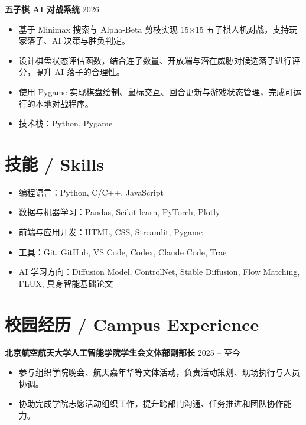 \documentclass[10pt,a4paper]{article}
\begin{document}
\textbf{五子棋 AI 对战系统} \hfill 2026
\begin{itemize}
    \item 基于 Minimax 搜索与 Alpha-Beta 剪枝实现 15$\times$15 五子棋人机对战，支持玩家落子、AI 决策与胜负判定。
    \item 设计棋盘状态评估函数，结合连子数量、开放端与潜在威胁对候选落子进行评分，提升 AI 落子的合理性。
    \item 使用 Pygame 实现棋盘绘制、鼠标交互、回合更新与游戏状态管理，完成可运行的本地对战程序。
    \item 技术栈：Python, Pygame
\end{itemize}

\section*{技能 / Skills}
\begin{itemize}
    \item 编程语言：Python, C/C++, JavaScript
    \item 数据与机器学习：Pandas, Scikit-learn, PyTorch, Plotly
    \item 前端与应用开发：HTML, CSS, Streamlit, Pygame
    \item 工具：Git, GitHub, VS Code, Codex, Claude Code, Trae
    \item AI 学习方向：Diffusion Model, ControlNet, Stable Diffusion, Flow Matching, FLUX, 具身智能基础论文
\end{itemize}

\section*{校园经历 / Campus Experience}
\textbf{北京航空航天大学人工智能学院学生会文体部副部长} \hfill 2025 -- 至今
\begin{itemize}
    \item 参与组织学院晚会、航天嘉年华等文体活动，负责活动策划、现场执行与人员协调。
    \item 协助完成学院志愿活动组织工作，提升跨部门沟通、任务推进和团队协作能力。
\end{itemize}
\end{document}

